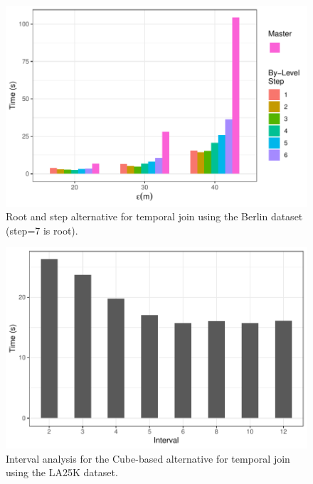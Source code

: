 \begin{figure}
    \centering
    \includegraphics[width=0.8\linewidth]{figures/plots/06_step_performance/step_performance.pdf}
    \caption{Root and step alternative for temporal join using the Berlin dataset (step=7 is root).}\label{fig:step_performance}
\end{figure}

\begin{figure}
    \centering
    \includegraphics[width=0.8\linewidth]{figures/plots/07_interval_performance/interval-performance.pdf}
    \caption{Interval analysis for the Cube-based alternative for temporal join using the LA25K dataset.}\label{fig:interval_performance}
\end{figure}


